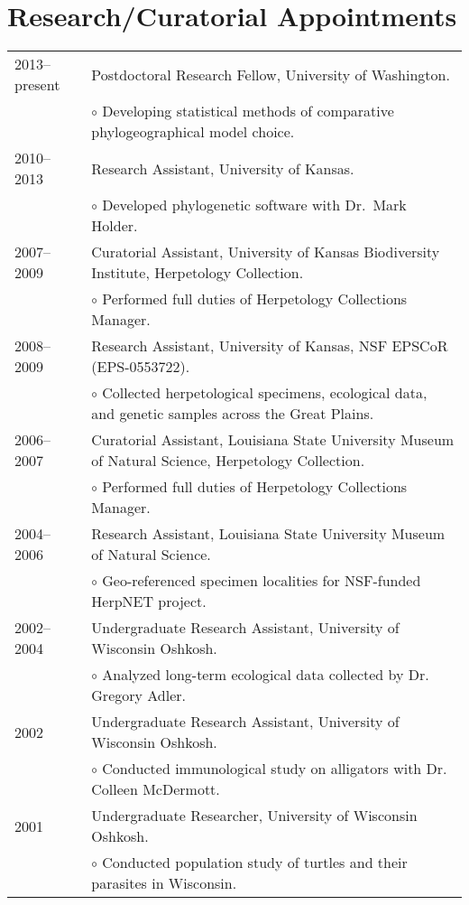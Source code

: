 \documentclass[10pt]{article}
\renewcommand{\labelitemi}{$\circ$}
\newcommand{\tableSubItem}{\addtolength{\leftskip}{1em} \labelitemi \xspace}
\begin{document}
\section*{Research/Curatorial Appointments}
\noindent\begin{tabulary}{\textwidth}{ @{} l L @{} }
2013--present & Postdoctoral Research Fellow, University of Washington. \\
            & \tableSubItem Developing statistical methods of comparative
              phylogeographical model choice. \\[0.25em]
2010--2013 & Research Assistant, University of Kansas. \\
            & \tableSubItem Developed phylogenetic software with Dr.\ Mark
              Holder. \\[0.25em]
2007--2009  & Curatorial Assistant, University of Kansas Biodiversity
              Institute, Herpetology Collection. \\
            & \tableSubItem Performed full duties of Herpetology Collections
              Manager. \\[0.25em]
2008--2009  & Research Assistant, University of Kansas, NSF EPSCoR
              (EPS-0553722). \\
            & \tableSubItem Collected herpetological specimens, ecological
              data, and genetic samples across the Great Plains. \\[0.25em]
2006--2007  & Curatorial Assistant, Louisiana State University Museum of
              Natural Science, Herpetology Collection. \\
            & \tableSubItem Performed full duties of Herpetology Collections
              Manager. \\[0.25em]
2004--2006  & Research Assistant, Louisiana State University Museum of Natural
              Science. \\
            & \tableSubItem Geo-referenced specimen localities for NSF-funded
              HerpNET project. \\[0.25em]
2002--2004  & Undergraduate Research Assistant, University of Wisconsin
              Oshkosh. \\
            & \tableSubItem Analyzed long-term ecological data collected by Dr.
              Gregory Adler. \\[0.25em]
2002        & Undergraduate Research Assistant, University of Wisconsin
              Oshkosh. \\
            & \tableSubItem Conducted immunological study on alligators with
              Dr. Colleen McDermott. \\[0.25em]
2001        & Undergraduate Researcher, University of Wisconsin Oshkosh. \\
            & \tableSubItem Conducted population study of turtles and their
              parasites in Wisconsin. \\
\end{tabulary}
\end{document}
